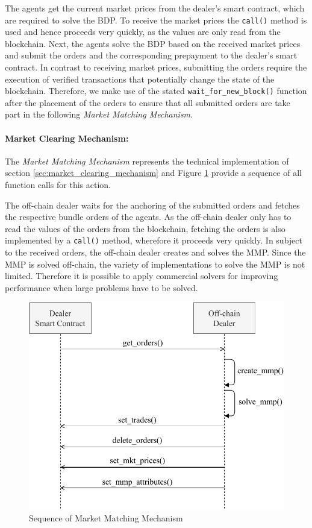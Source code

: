 The agents get the current market prices from the dealer's smart contract, which are required to solve 
the BDP.
To receive the market prices the \verb|call()| method is used and hence proceeds very quickly,
as the values are only read from the blockchain.
Next, the agents solve the BDP based on the received market prices and submit 
the orders and the corresponding prepayment to the dealer's smart contract. In contrast to receiving market prices, 
submitting the orders require the execution of verified transactions that potentially
change the state of the blockchain. Therefore, we make use of the stated 
\verb|wait_for_new_block()| function after the placement of the orders to ensure 
that all submitted orders are take part in the following \textit{Market Matching Mechanism}.


\paragraph{Market Clearing Mechanism:}
The \textit{Market Matching Mechanism} represents the technical implementation of section 
\ref{sec:market_clearing_mechanism} and Figure \ref{figure:dealers_mmp} provide 
a sequence of all function calls for this action.

The off-chain dealer waits for the anchoring of the submitted orders and fetches the 
respective bundle orders of the agents. 
As the off-chain dealer only has to read the values of the orders from the blockchain,
fetching the orders is also implemented by a \verb|call()| method, wherefore it proceeds very quickly.
In subject to the received orders, the off-chain dealer creates and solves the MMP.
Since the MMP is solved off-chain, the variety of implementations to solve the MMP is 
not limited. Therefore it is possible to apply commercial solvers for improving 
performance when large problems have to be solved.

\begin{figure}[htbp]
	\centering
	\includegraphics[width=.8\linewidth]{./figures/dealers_mmp.pdf}
	\caption{Sequence of Market Matching Mechanism}
	\label{figure:dealers_mmp}
\end{figure}


